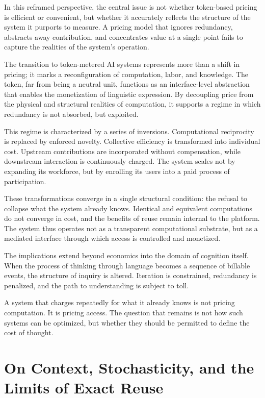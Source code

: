 \documentclass[12pt, oneside]{article}
\begin{document}
In this reframed perspective, the central issue is not whether token-based pricing is efficient or convenient, but whether it accurately reflects the structure of the system it purports to measure. A pricing model that ignores redundancy, abstracts away contribution, and concentrates value at a single point fails to capture the realities of the system's operation.

The transition to token-metered AI systems represents more than a shift in pricing; it marks a reconfiguration of computation, labor, and knowledge. The token, far from being a neutral unit, functions as an interface-level abstraction that enables the monetization of linguistic expression. By decoupling price from the physical and structural realities of computation, it supports a regime in which redundancy is not absorbed, but exploited.

This regime is characterized by a series of inversions. Computational reciprocity is replaced by enforced novelty. Collective efficiency is transformed into individual cost. Upstream contributions are incorporated without compensation, while downstream interaction is continuously charged. The system scales not by expanding its workforce, but by enrolling its users into a paid process of participation.

These transformations converge in a single structural condition: the refusal to collapse what the system already knows. Identical and equivalent computations do not converge in cost, and the benefits of reuse remain internal to the platform. The system thus operates not as a transparent computational substrate, but as a mediated interface through which access is controlled and monetized.

The implications extend beyond economics into the domain of cognition itself. When the process of thinking through language becomes a sequence of billable events, the structure of inquiry is altered. Iteration is constrained, redundancy is penalized, and the path to understanding is subject to toll.

A system that charges repeatedly for what it already knows is not pricing computation. It is pricing access. The question that remains is not how such systems can be optimized, but whether they should be permitted to define the cost of thought.

\section{On Context, Stochasticity, and the Limits of Exact Reuse}
\end{document}
